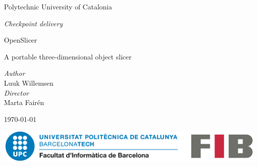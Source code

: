 
\center 

\Large
Polytechnic University of Catalonia

\vspace{.5cm}
\large


\textit{Checkpoint delivery}

\roboto
\vspace*{1cm}
\HUGE
\textcolor{title-red}{OpenSlicer}

\vspace{0.5cm}

\LARGE
A portable three-dimensional object slicer

\vspace{1cm}


\normalsize \textit{Author} \\ \large{Luuk Willemsen} \\ \vspace{0.5cm}
\normalsize \textit{Director} \\ \large{Marta Fairén} \\ \vspace{0.5cm}


\vspace{2cm}

\normalsize
\today

\vspace{3cm}


\includegraphics[width=1\textwidth]{images/fib-upc.png}